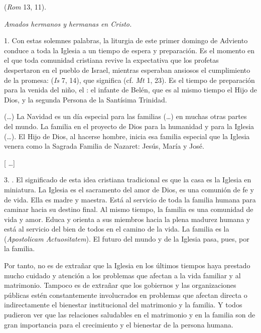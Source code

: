 				\begin{body}
					 (\emph{Rom} 13, 11).
					
					\emph{Amados hermanos y hermanas en Cristo.}
					
					1. Con estas solemnes palabras, la liturgia de este primer domingo de Adviento conduce a toda la Iglesia a un tiempo de espera y preparación. Es el momento en el que toda comunidad cristiana revive la expectativa que los profetas despertaron en el pueblo de Israel, mientras esperaban ansiosos el cumplimiento de la promesa:  (\emph{Is} 7, 14), que significa  (cf. \emph{Mt} 1, 23). Es el tiempo de preparación para la venida del niño, el : el infante de Belén, que es al mismo tiempo el Hijo de Dios, y la segunda Persona de la Santísima Trinidad.
					
					(\ldots{}) La Navidad es un día especial para las familias (\ldots{}) en muchas otras partes del mundo. La familia en el proyecto de Dios para la humanidad y para la Iglesia (\ldots{}). El Hijo de Dios, al hacerse hombre, inicia esa familia especial que la Iglesia venera como la Sagrada Familia de Nazaret: Jesús, María y José.
					
					{[} \ldots{}{]}
					
					3. . El significado de esta idea cristiana tradicional es que la casa es la Iglesia en miniatura. La Iglesia es el sacramento del amor de Dios, es una comunión de fe y de vida. Ella es madre y maestra. Está al servicio de toda la familia humana para caminar hacia su destino final. Al mismo tiempo, la familia es una comunidad de vida y amor. Educa y orienta a sus miembros hacia la plena madurez humana y está al servicio del bien de todos en el camino de la vida. La familia es la  ({\emph{Apostolicam Actuositatem}}). El futuro del mundo y de la Iglesia pasa, pues, por la familia.
					
					Por tanto, no es de extrañar que la Iglesia en los últimos tiempos haya prestado mucho cuidado y atención a los problemas que afectan a la vida familiar y al matrimonio. Tampoco es de extrañar que los gobiernos y las organizaciones públicas estén constantemente involucrados en problemas que afectan directa o indirectamente el bienestar institucional del matrimonio y la familia. Y todos pudieron ver que las relaciones saludables en el matrimonio y en la familia son de gran importancia para el crecimiento y el bienestar de la persona humana.
					

\end{body}
